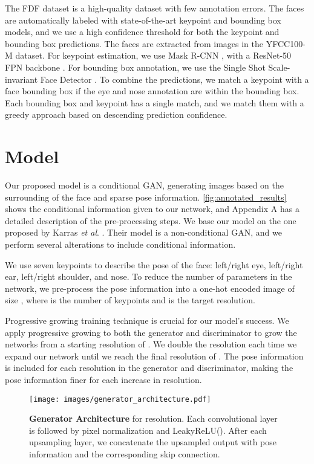 \documentclass[runningheads]{llncs}
\newcommand{\etal}{\textit{et al}. }
\begin{document}
The FDF dataset is a high-quality dataset with few annotation errors. 
The faces are automatically labeled with state-of-the-art keypoint and bounding box models, and we use a high confidence threshold for both the keypoint and bounding box predictions.
The faces are  extracted from  images in the YFCC100-M dataset.  For keypoint estimation, we use Mask R-CNN \cite{He2017}, with a ResNet-50 FPN backbone \cite{Lin2017FeatureDetection}. For bounding box annotation, we use the Single Shot Scale-invariant Face Detector \cite{Zhang2017S3fd:Detector}. 
To combine the predictions, we match a keypoint with a face bounding box if the eye and nose annotation are within the bounding box.
Each bounding box and keypoint has a single match, and we match them with a greedy approach based on descending prediction confidence. \section{Model}

Our proposed model is a conditional GAN, generating images based on the surrounding of the face and sparse pose information. \autoref{fig:annotated_results} shows the conditional information given to our network, and Appendix A has a detailed description of the pre-processing steps.
We base our model on the one proposed by Karras \etal \cite{Karras2017}. Their model is a non-conditional GAN, and we perform several alterations to include conditional information. 


We use seven keypoints to describe the pose of the face: left/right eye, left/right ear, left/right shoulder, and nose. To reduce the number of parameters in the network, we pre-process the pose information into a one-hot encoded image of size , where  is the number of keypoints and  is the target resolution. 

Progressive growing training technique is crucial for our model's success.
We apply progressive growing to both the generator and discriminator to grow the networks from a starting resolution of . We double the resolution each time we expand our network until we reach the final resolution of . 
The pose information is included for each resolution in the generator and discriminator, making the pose information finer for each increase in resolution.

\begin{figure}
    \centering
    \texttt{[image: images/generator\_architecture.pdf]}
    \caption{\textbf{Generator Architecture} for  resolution. Each convolutional layer is followed by pixel normalization \cite{Karras2017} and LeakyReLU().
    After each upsampling layer, we concatenate the upsampled output with pose information and the corresponding skip connection.}
    \label{fig:generator_architecture}
\end{figure}
\end{document}
